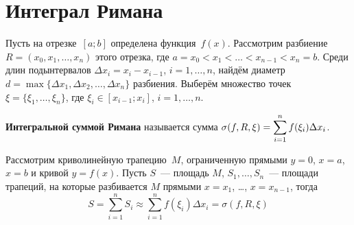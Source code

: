 \section{Интеграл Римана}
Пусть на отрезке~$[a; b]$ определена функция~$f(x)$.
Рассмотрим разбиение~$R = (x_0, x_1, \ldots, x_n)$ этого отрезка, где $a = x_0 < x_1 < \ldots < x_{n-1} < x_n = b$.
Среди длин подынтервалов $\Delta x_i = x_i - x_{i-1}$, $i = 1, \ldots, n$, найдём диаметр $d = \max \{ \Delta x_1, \Delta x_2, \ldots, \Delta x_n \}$ разбиения.
Выберём множество точек $\xi = \{ \xi_1, \ldots, \xi_n \}$, где $\xi_i \in [x_{i-1}; x_i]$, $i = 1, \ldots, n$.

\begin{wrapfigure}[10]{r}{0pt}
\noindent
{}
\end{wrapfigure}

\textbf{Интегральной суммой Римана} называется сумма $\displaystyle \sigma(f, R, \xi) \opbr= \sum_{i=1}^n f(\xi_i) \Delta x_i$.

Рассмотрим криволинейную трапецию~$M$, ограниченную прямыми $y = 0$, $x = a$, $x = b$ и кривой $y = f(x)$. Пусть $S$~--- площадь $M$, $S_1, \ldots, S_n$~--- площади трапеций, на которые разбивается $M$ прямыми $x = x_1$, \ldots, $x = x_{n-1}$, тогда
\begin{equation*}
S = \sum_{i=1}^n S_i \approx \sum_{i=1}^n f(\xi_i) \Delta x_i = \sigma(f, R, \xi)
\end{equation*}


